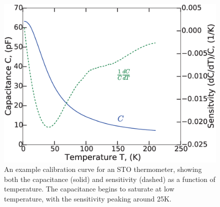 \documentclass{thesis-umich}
\begin{document}
\begin{figure} \caption[Example STO Thermometer Calibration]{An example calibration curve for an STO thermometer,
  showing both the capacitance (solid) and sensitivity (dashed) as a function of
temperature. The capacitance begins to saturate at low temperature, with the
sensitivity peaking around 25K. } \label{fig:cal_curve}\centering
\includegraphics[width=\columnwidth]{figures/cvt_apl.eps}
\end{figure}
\end{document}
